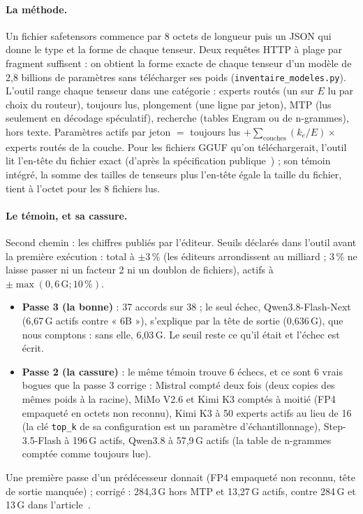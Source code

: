 \paragraph{La méthode.} Un fichier safetensors commence par 8 octets de longueur puis un JSON qui donne le type et la forme de chaque tenseur. Deux requêtes HTTP à plage par fragment suffisent : on obtient la forme exacte de chaque tenseur d'un modèle de 2,8 billions de paramètres sans télécharger ses poids (\texttt{inventaire\_modeles.py}). L'outil range chaque tenseur dans une catégorie : experts routés (un sur $E$ lu par choix du routeur), toujours lus, plongement (une ligne par jeton), MTP (lus seulement en décodage spéculatif), recherche (tables Engram ou de n-grammes), hors texte. Paramètres actifs par jeton $=$ toujours lus $+ \sum_{\text{couches}} (k_e/E) \times$ experts routés de la couche. Pour les fichiers GGUF qu'on téléchargerait, l'outil lit l'en-tête du fichier exact (d'après la spécification publique~\cite{gguf2026}) ; son témoin intégré, la somme des tailles de tenseurs plus l'en-tête égale la taille du fichier, tient à l'octet pour les 8 fichiers lus.

\paragraph{Le témoin, et sa cassure.} Second chemin : les chiffres publiés par l'éditeur. Seuils déclarés dans l'outil avant la première exécution : total à $\pm 3$\,\% (les éditeurs arrondissent au milliard ; 3\,\% ne laisse passer ni un facteur 2 ni un doublon de fichiers), actifs à $\pm\max(0{,}6\,\mathrm{G} ; 10\,\%)$.
\begin{itemize}
\item \textbf{Passe 3 (la bonne)} : 37 accords sur 38 ; le seul échec, Qwen3.8-Flash-Next (6,67\,G actifs contre « 6B »), s'explique par la tête de sortie (0,636\,G), que nous comptons : sans elle, 6,03\,G. Le seuil reste ce qu'il était et l'échec est écrit.
\item \textbf{Passe 2 (la cassure)} : le même témoin trouve 6 échecs, et ce sont 6 vrais bogues que la passe 3 corrige : Mistral compté deux fois (deux copies des mêmes poids à la racine), MiMo V2.6 et Kimi K3 comptés à moitié (FP4 empaqueté en octets non reconnu), Kimi K3 à 50 experts actifs au lieu de 16 (la clé \texttt{top\_k} de sa configuration est un paramètre d'échantillonnage), Step-3.5-Flash à 196\,G actifs, Qwen3.8 à 57,9\,G actifs (la table de n-grammes comptée comme toujours lue).
\end{itemize}
Une première passe d'un prédécesseur donnait  (FP4 empaqueté non reconnu, tête de sortie manquée) ; corrigé : 284,3\,G hors MTP et 13,27\,G actifs, contre 284\,G et 13\,G dans l'article~\cite{deepseekv4_2026}.

